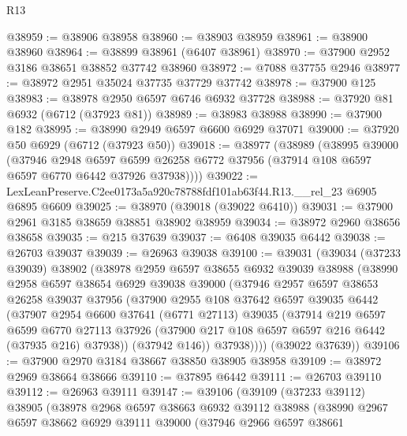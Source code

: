 \begin{lexlean}{R13}
\begin{coremodule}
@38959 := @38906 @38958
@38960 := @38903 @38959
@38961 := @38900 @38960
@38964 := @38899 @38961 (@6407 @38961)
@38970 := @37900 @2952 @3186 @38651 @38852 @37742 @38960
@38972 := @7088 @37755 @2946
@38977 := @38972 @2951 @35024 @37735 @37729 @37742
@38978 := @37900 @125
@38983 := @38978 @2950 @6597 @6746 @6932 @37728
@38988 := @37920 @81 @6932 (@6712 (@37923 @81))
@38989 := @38983 @38988
@38990 := @37900 @182
@38995 := @38990 @2949 @6597 @6600 @6929 @37071
@39000 := @37920 @50 @6929 (@6712 (@37923 @50))
@39018 := @38977
    (@38989
      (@38995
        @39000
        (@37946
          @2948
          @6597
          @6599
          @26258
          @6772
          @37956
          (@37914 @108 @6597 @6597 @6770 @6442 @37926 @37938))))
@39022 := LexLeanPreserve.C2ee0173a5a920c78788fdf101ab63f44.R13.__rel_23 @6905 @6895 @6609
@39025 := @38970 (@39018 (@39022 @6410))
@39031 := @37900 @2961 @3185 @38659 @38851 @38902 @38959
@39034 := @38972 @2960 @38656 @38658
@39035 := @215 @37639
@39037 := @6408 @39035 @6442
@39038 := @26703 @39037
@39039 := @26963 @39038
@39100 := @39031
    (@39034
      (@37233 @39039)
      @38902
      (@38978
        @2959
        @6597
        @38655
        @6932
        @39039
        @38988
        (@38990
          @2958
          @6597
          @38654
          @6929
          @39038
          @39000
          (@37946
            @2957
            @6597
            @38653
            @26258
            @39037
            @37956
            (@37900
              @2955
              @108
              @37642
              @6597
              @39035
              @6442
              (@37907
                @2954
                @6600
                @37641
                (@6771 @27113)
                @39035
                (@37914
                  @219
                  @6597
                  @6599
                  @6770
                  @27113
                  @37926
                  (@37900 @217 @108 @6597 @6597 @216 @6442 (@37935 @216) @37938))
                (@37942 @146))
              @37938))))
      (@39022 @37639))
@39106 := @37900 @2970 @3184 @38667 @38850 @38905 @38958
@39109 := @38972 @2969 @38664 @38666
@39110 := @37895 @6442
@39111 := @26703 @39110
@39112 := @26963 @39111
@39147 := @39106
    (@39109
      (@37233 @39112)
      @38905
      (@38978
        @2968
        @6597
        @38663
        @6932
        @39112
        @38988
        (@38990
          @2967
          @6597
          @38662
          @6929
          @39111
          @39000
          (@37946
            @2966
            @6597
            @38661

\end{coremodule}
\end{lexlean}
